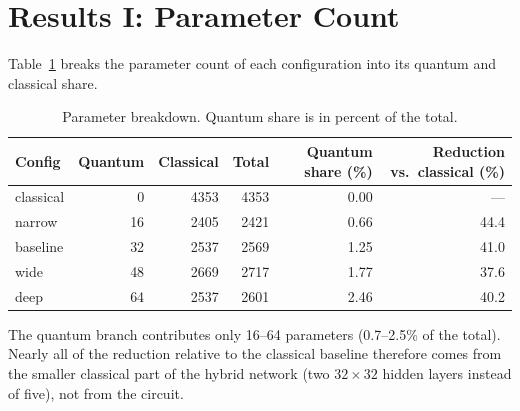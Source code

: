 \section{Results I: Parameter Count}
\label{sec:res-params}

Table~\ref{tab:params} breaks the parameter count of each configuration into its quantum and classical share.

\begin{table}[h]
\centering
\caption{Parameter breakdown. Quantum share is in percent of the total.}
\label{tab:params}
\begin{tabular}{@{}lrrrrr@{}}
\toprule
Config & Quantum & Classical & Total & Quantum share (\%) & Reduction vs.\ classical (\%) \\
\midrule
classical & 0  & 4353 & 4353 & 0.00 & --- \\
narrow    & 16 & 2405 & 2421 & 0.66 & 44.4 \\
baseline  & 32 & 2537 & 2569 & 1.25 & 41.0 \\
wide      & 48 & 2669 & 2717 & 1.77 & 37.6 \\
deep      & 64 & 2537 & 2601 & 2.46 & 40.2 \\
\bottomrule
\end{tabular}
\end{table}

The quantum branch contributes only 16--64 parameters (0.7--2.5\% of the total). Nearly all of the reduction
relative to the classical baseline therefore comes from the smaller classical part of the hybrid network
(two $32\times32$ hidden layers instead of five), not from the circuit.
